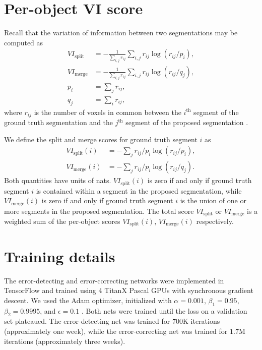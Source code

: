 \documentclass{article}
\begin{document}
\section{Per-object VI score}
\label{appendix:vi}
 Recall that the variation of information between two segmentations may be computed as
\begin{align*}
	VI_\text{split}&=-\frac 1 {\sum_{i,j} r_{ij}} \sum_{i,j} r_{ij} \log\left(r_{ij}/p_i\right),\\
	VI_\text{merge}&=-\frac 1 {\sum_{i,j} r_{ij}} \sum_{i,j} r_{ij} \log\left(r_{ij}/q_j\right),\\
	p_i&=\sum_j r_{ij},\\
	q_j&=\sum_i r_{ij},
\end{align*}
where $r_{ij}$ is the number of voxels in common between the $i^\text{th}$ segment of the ground truth segmentation and the $j^\text{th}$ segment of the proposed segmentation \cite{vi}.

We define the split and merge scores for ground truth segment $i$ as
\begin{align*}
	VI_\text{split}(i) &= -\sum_j r_{ij}/p_i \log(r_{ij}/p_i),\\
	VI_\text{merge}(i) &= -\sum_j r_{ij}/p_i \log(r_{ij}/q_j).
\end{align*}
Both quantities have units of nats. $VI_\text{split}(i)$ is zero if and only if
ground truth segment $i$ is contained within a segment in the proposed
segmentation, while $VI_\text{merge}(i)$ is zero if and only if ground truth
segment $i$ is the union of one or more segments in the proposed segmentation.
The total score $VI_\text{split}$ or $VI_\text{merge}$ is a weighted sum of the
per-object scores $VI_\text{split}(i)$, $VI_\text{merge}(i)$ respectively.


\section{Training details} The error-detecting and error-correcting networks
were implemented in TensorFlow \cite{tensorflow} and trained using 4 TitanX
Pascal GPUs with synchronous gradient descent. We used the Adam optimizer,
initialized with $\alpha=0.001$, $\beta_1=0.95$, $\beta_2=0.9995$, and
$\epsilon=0.1$ \cite{adam}.   Both nets were trained until the loss on a
validation set plateaued. The error-detecting net was trained for $700$K
iterations (approximately one week), while the error-correcting net was trained
for $1.7$M iterations (approximately three weeks).

\newpage


\end{document}
